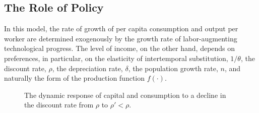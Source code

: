 \documentclass[\topdir/lecture\_notes.tex]{subfiles}
\begin{document}
\subsection{The Role of Policy}
In this model, the rate of growth of per capita consumption and output per worker are determined exogenously by the growth rate of labor-augmenting technological progress. The level of income, on the other hand, depends on preferences, in particular, on the elasticity of intertemporal substitution, \(1 / \theta\), the discount rate, \(\rho\), the depreciation rate, \(\delta\), the population growth rate, \(n\), and naturally the form of the production function \(f(\cdot)\).

\begin{figure}[ht]
  \centering
  \captionsetup{labelformat=empty}
  \caption{The dynamic response of capital and consumption to a decline in the discount rate from \(\rho\) to \(\rho' < \rho\).}
  \label{fig:discount-change}
\end{figure}
\end{document}
